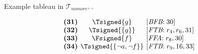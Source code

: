 \begin{frame}{Example tableau in $\mathcal{T}_{\textit{nomore}^{++}}$}
\begin{center}
\begin{minipage}[t]{16cm}
\begin{minipage}[t]{6cm}
\begin{minipage}[t]{2cm}
\[\begin{array}{l@{~~}c@{~~}l}
\textbf{(31)}                                      &
  \Tsigned{g}                                      &
  [\textit{BFB}{:}\;\text{30}]                     \\
\textbf{(32)}                                      &
  \Tsigned{\{g\}}                                  &
  [\textit{FTB}{:}\;r_4, r_6, \text{31}]           \\
\textbf{(33)}                                      &
  \Fsigned{f}                                      &
  [\textit{FFA}{:}\;r_8, \text{30}]                \\
\textbf{(34)}                                      & \hspace{-0.1cm}
  \Tsigned{\{\neg a,\neg f\}}      \hspace{-0.1cm} &
  [\textit{FTB}{:}\;r_9, \text{16}, \text{33}]
\end{array}
\]
\end{minipage}
\end{minipage}
\end{minipage}
\end{center}
\end{frame}
